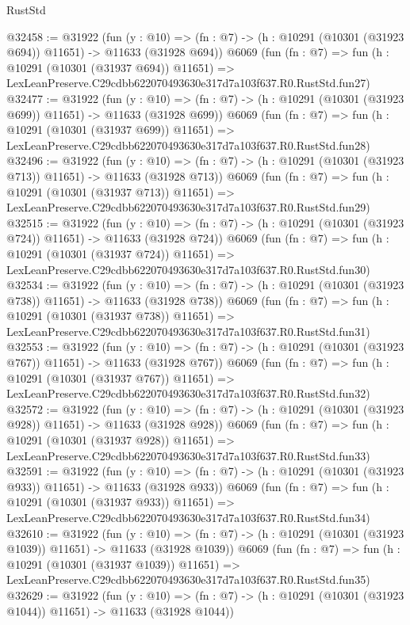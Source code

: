 \begin{lexlean}{RustStd}
\begin{coremodule}
@32458 := @31922
    (fun (y : @10) =>
    (fn : @7) -> (h : @10291 (@10301 (@31923 @694)) @11651) -> @11633 (@31928 @694))
    @6069
    (fun (fn : @7) =>
    fun (h : @10291 (@10301 (@31937 @694)) @11651) =>
    LexLeanPreserve.C29cdbb622070493630e317d7a103f637.R0.RustStd.fun27)
@32477 := @31922
    (fun (y : @10) =>
    (fn : @7) -> (h : @10291 (@10301 (@31923 @699)) @11651) -> @11633 (@31928 @699))
    @6069
    (fun (fn : @7) =>
    fun (h : @10291 (@10301 (@31937 @699)) @11651) =>
    LexLeanPreserve.C29cdbb622070493630e317d7a103f637.R0.RustStd.fun28)
@32496 := @31922
    (fun (y : @10) =>
    (fn : @7) -> (h : @10291 (@10301 (@31923 @713)) @11651) -> @11633 (@31928 @713))
    @6069
    (fun (fn : @7) =>
    fun (h : @10291 (@10301 (@31937 @713)) @11651) =>
    LexLeanPreserve.C29cdbb622070493630e317d7a103f637.R0.RustStd.fun29)
@32515 := @31922
    (fun (y : @10) =>
    (fn : @7) -> (h : @10291 (@10301 (@31923 @724)) @11651) -> @11633 (@31928 @724))
    @6069
    (fun (fn : @7) =>
    fun (h : @10291 (@10301 (@31937 @724)) @11651) =>
    LexLeanPreserve.C29cdbb622070493630e317d7a103f637.R0.RustStd.fun30)
@32534 := @31922
    (fun (y : @10) =>
    (fn : @7) -> (h : @10291 (@10301 (@31923 @738)) @11651) -> @11633 (@31928 @738))
    @6069
    (fun (fn : @7) =>
    fun (h : @10291 (@10301 (@31937 @738)) @11651) =>
    LexLeanPreserve.C29cdbb622070493630e317d7a103f637.R0.RustStd.fun31)
@32553 := @31922
    (fun (y : @10) =>
    (fn : @7) -> (h : @10291 (@10301 (@31923 @767)) @11651) -> @11633 (@31928 @767))
    @6069
    (fun (fn : @7) =>
    fun (h : @10291 (@10301 (@31937 @767)) @11651) =>
    LexLeanPreserve.C29cdbb622070493630e317d7a103f637.R0.RustStd.fun32)
@32572 := @31922
    (fun (y : @10) =>
    (fn : @7) -> (h : @10291 (@10301 (@31923 @928)) @11651) -> @11633 (@31928 @928))
    @6069
    (fun (fn : @7) =>
    fun (h : @10291 (@10301 (@31937 @928)) @11651) =>
    LexLeanPreserve.C29cdbb622070493630e317d7a103f637.R0.RustStd.fun33)
@32591 := @31922
    (fun (y : @10) =>
    (fn : @7) -> (h : @10291 (@10301 (@31923 @933)) @11651) -> @11633 (@31928 @933))
    @6069
    (fun (fn : @7) =>
    fun (h : @10291 (@10301 (@31937 @933)) @11651) =>
    LexLeanPreserve.C29cdbb622070493630e317d7a103f637.R0.RustStd.fun34)
@32610 := @31922
    (fun (y : @10) =>
    (fn : @7) -> (h : @10291 (@10301 (@31923 @1039)) @11651) -> @11633 (@31928 @1039))
    @6069
    (fun (fn : @7) =>
    fun (h : @10291 (@10301 (@31937 @1039)) @11651) =>
    LexLeanPreserve.C29cdbb622070493630e317d7a103f637.R0.RustStd.fun35)
@32629 := @31922
    (fun (y : @10) =>
    (fn : @7) -> (h : @10291 (@10301 (@31923 @1044)) @11651) -> @11633 (@31928 @1044))

\end{coremodule}
\end{lexlean}
